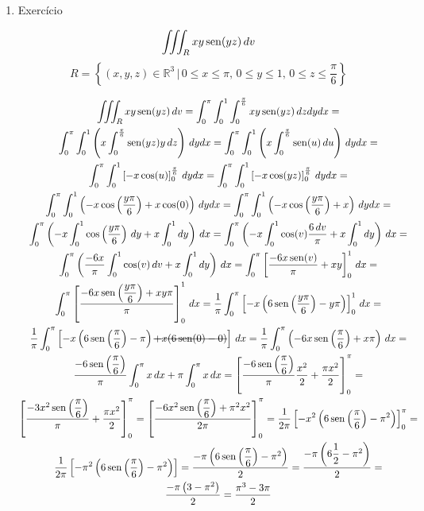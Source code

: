 \begin{enumerate}
	\item Exercício
	
	\begin{equation*}
		\iiint_R xy\operatorname{sen}(yz)\, dv
	\end{equation*}
	\begin{equation*}
		R = \left\{(x, y, z) \in \mathbb{R}^3 \,|\, 0 \leq x \leq \pi,\, 0 \leq y \leq 1,\, 0 \leq z \leq \dfrac{\pi}{6}\right\}
	\end{equation*}
	
	\begin{gather*}
		\iiint_R xy\sen(yz)\, dv = \int_0^{\pi} \int_0^1 \int_0^{\frac{\pi}{6}} xy\sen(yz)\, dzdydx =\\  \int_0^{\pi} \int_0^1\left(x\int_0^{\frac{\pi}{6}} \sen(yz)y\, dz\right)\, dydx = \int_0^{\pi} \int_0^1\left(x\int_0^{\frac{\pi}{6}} \sen(u)\, du\right)\, dydx =\\ \int_0^{\pi} \int_0^1 \left[-x\cos(u)\right]_0^{\frac{\pi}{6}}\, dydx = \int_0^{\pi} \int_0^1 \left[-x\cos(yz)\right]_0^{\frac{\pi}{6}}\, dydx =\\ \int_0^{\pi} \int_0^1 \left(-x\cos\left(\dfrac{y\pi}{6}\right) + x\cos(0)\right)\, dydx = \int_0^{\pi} \int_0^1 \left(-x\cos\left(\dfrac{y\pi}{6}\right) + x\right)\, dydx =\\ \int_0^{\pi}\left(-x\int_0^1\cos\left(\dfrac{y\pi}{6}\right)\, dy + x\int_0^1 dy \right)\, dx = \int_0^{\pi}\left(-x\int_0^1\cos(v)\dfrac{6\, dv}{\pi} + x\int_0^1 dy \right)\, dx =\\ \int_0^{\pi}\left(\dfrac{-6x}{\pi}\int_0^1\cos(v)\, dv + x\int_0^1 dy \right)\, dx = \int_0^{\pi}\left[\dfrac{-6x\sen(v)}{\pi} + xy\right]_0^1\, dx =\\ \int_0^{\pi}\left[\dfrac{-6x\sen\left(\dfrac{y\pi}{6}\right) + xy\pi}{\pi}\right]_0^1\, dx = \dfrac{1}{\pi}\int_0^{\pi}\left[-x\left(6\sen\left(\dfrac{y\pi}{6}\right) - y\pi\right)\right]_0^1\, dx =\\ \dfrac{1}{\pi}\int_0^{\pi}\left[-x\left(6\sen\left(\dfrac{\pi}{6}\right) - \pi\right) \overstrike{+ x(6\sen(0) - 0)}\right]\, dx = \dfrac{1}{\pi}\int_0^{\pi}\left(-6x\sen\left(\dfrac{\pi}{6}\right) + x\pi\right)\, dx =\\ \dfrac{-6\sen\left(\dfrac{\pi}{6}\right)}{\pi}\int_0^{\pi} x\, dx + \pi\int_0^{\pi} x\, dx = \left[\dfrac{-6\sen\left(\dfrac{\pi}{6}\right)}{\pi}\dfrac{x^2}{2} + \dfrac{\pi x^2}{2}\right]_0^{\pi} =\\ \left[\dfrac{-3x^2\sen\left(\dfrac{\pi}{6}\right)}{\pi} + \dfrac{\pi x^2}{2}\right]_0^{\pi} = \left[\dfrac{-6x^2\sen\left(\dfrac{\pi}{6}\right) + \pi^2 x^2}{2\pi}\right]_0^{\pi} = \dfrac{1}{2\pi}\left[-x^2\left(6\sen\left(\dfrac{\pi}{6}\right) - \pi^2\right)\right]_0^{\pi} =\\ \dfrac{1}{2\pi}\left[-\pi^2\left(6\sen\left(\dfrac{\pi}{6}\right) - \pi^2\right)\right] = \dfrac{-\pi\left(6\sen\left(\dfrac{\pi}{6}\right) - \pi^2\right)}{2} = \dfrac{-\pi\left(6\dfrac{1}{2} - \pi^2\right)}{2} =\\ \dfrac{-\pi\left(3 - \pi^2\right)}{2} = \dfrac{\pi^3 - 3\pi}{2}

\end{gather*}
\end{enumerate}
